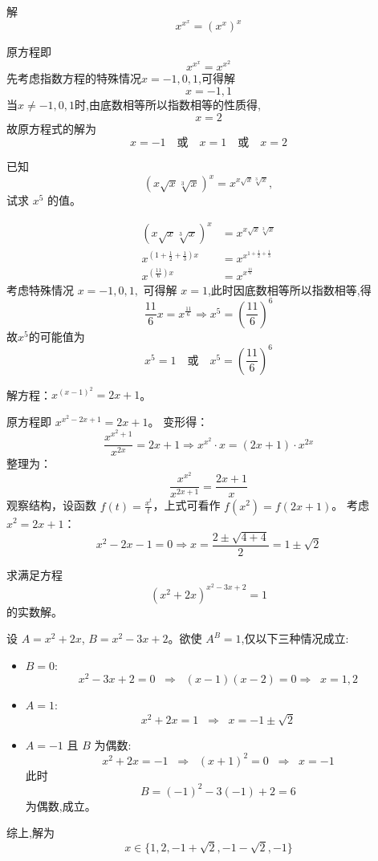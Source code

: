 \begin{questions}
    \question 解 
    \[
    x^{x^{x}} = (x^{x})^{x}
    \]
    \begin{solution}
        原方程即
        \[
        x^{x^{x}} = x^{x^2}
        \]
        先考虑指数方程的特殊情况$x=-1,0,1$,可得解
        \[
        x=-1,1
        \]
        当$x \neq -1,0,1$时,由底数相等所以指数相等的性质得,
        \[
        x=2
        \]
        故原方程式的解为
        \[
        x=-1 \quad \text{或} \quad x=1 \quad \text{或} \quad x=2
        \]
    \end{solution}

    \question 已知 
    \[
    (x\sqrt{x}\sqrt[3]{x})^{x} = x^{x\sqrt{x}\sqrt[3]{x}},
    \]
    试求 $x^{5}$ 的值。
    \begin{solution}
        \begin{align*}
        (x\sqrt{x}\sqrt[3]{x})^{x} &= x^{x\sqrt{x}\sqrt[3]{x}} \\
        x^{(1+\frac{1}{2}+\frac{1}{3})x} &= x^{x^{1+\frac{1}{2}+\frac{1}{3}}}\\
        x^{(\frac{11}{6})x} &= x^{x^{\frac{11}{6}}}
        \end{align*}
        考虑特殊情况 $x=-1, 0, 1,$ 可得解 $x=1$,此时因底数相等所以指数相等,得
        \[
        \frac{11}{6}x = x^{\frac{11}{6}} \Rightarrow x^5 = \left(\frac{11}{6}\right)^{6} 
        \]
        故$x^5$的可能值为
        \[
        x^5=1 \quad \text{或} \quad x^5 = \left(\frac{11}{6}\right)^{6}
        \]
    \end{solution}

    \question 解方程：$x^{(x-1)^2} = 2x + 1$。

\begin{solution}
原方程即 $x^{x^2 - 2x + 1} = 2x + 1$。
变形得：
\[
\frac{x^{x^2+1}}{x^{2x}} = 2x + 1 \Rightarrow x^{x^2} \cdot x = (2x + 1) \cdot x^{2x}
\]
整理为：
\[
\frac{x^{x^2}}{x^{2x+1}} = \frac{2x+1}{x}
\]
观察结构，设函数 $f(t) = \frac{x^t}{t}$，上式可看作 $f(x^2) = f(2x+1)$。
考虑 $x^2 = 2x + 1$：
\[
x^2 - 2x - 1 = 0 \Rightarrow x = \frac{2 \pm \sqrt{4 + 4}}{2} = 1 \pm \sqrt{2}
\]
\end{solution}

    \question 求满足方程 
    \[
    (x^{2}+2x)^{x^{2}-3x+2}=1
    \] 
    的实数解。
    \begin{solution}
        设 $A=x^{2}+2x$, $B=x^{2}-3x+2$。欲使 $A^{B}=1$,仅以下三种情况成立:
        \begin{itemize}
        \item $B=0$:
        \[
        x^{2}-3x+2=0 \;\;\Rightarrow\;\; (x-1)(x-2)=0\Rightarrow\;\;x=1,2
        \]
        \item $A=1$:
        \[
        x^{2}+2x=1 \;\;\Rightarrow\;\; x=-1\pm\sqrt{2}
        \]
        \item $A=-1$ 且 $B$ 为偶数: 
        \[
        x^{2}+2x=-1 \;\;\Rightarrow\;\; (x+1)^{2}=0 \;\;\Rightarrow\;\; x=-1
        \]  
        此时  
        \[
        B=(-1)^{2}-3(-1)+2=6
        \]  
        为偶数,成立。
        \end{itemize}
        综上,解为  
        \[
        x\in \{1,2,-1+\sqrt{2},-1-\sqrt{2},-1\}
        \]
    \end{solution}


\end{questions}
